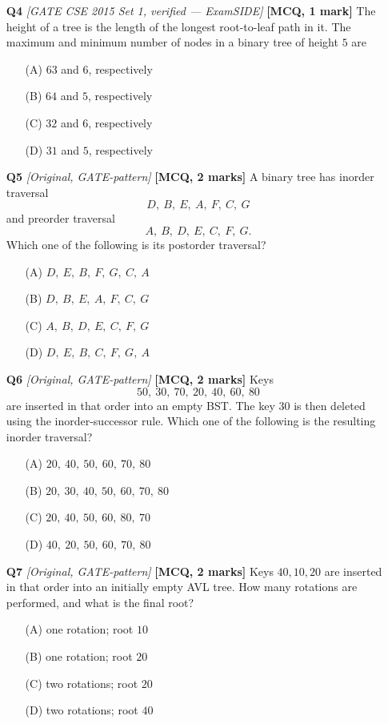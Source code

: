 \documentclass[11pt]{article}
\begin{document}
\begin{enumerate}
\item[\textbf{Q4}] \textit{[GATE CSE 2015 Set 1, verified --- ExamSIDE]} \textbf{[MCQ, 1 mark]} The height of a tree is the length of the longest root-to-leaf path in it. The maximum and minimum number of nodes in a binary tree of height $5$ are
\begin{enumerate}
  \item[(A)] $63$ and $6$, respectively
  \item[(B)] $64$ and $5$, respectively
  \item[(C)] $32$ and $6$, respectively
  \item[(D)] $31$ and $5$, respectively
\end{enumerate}

\item[\textbf{Q5}] \textit{[Original, GATE-pattern]} \textbf{[MCQ, 2 marks]} A binary tree has inorder traversal
\[
  D,\ B,\ E,\ A,\ F,\ C,\ G
\]
and preorder traversal
\[
  A,\ B,\ D,\ E,\ C,\ F,\ G.
\]
Which one of the following is its postorder traversal?
\begin{enumerate}
  \item[(A)] $D,\ E,\ B,\ F,\ G,\ C,\ A$
  \item[(B)] $D,\ B,\ E,\ A,\ F,\ C,\ G$
  \item[(C)] $A,\ B,\ D,\ E,\ C,\ F,\ G$
  \item[(D)] $D,\ E,\ B,\ C,\ F,\ G,\ A$
\end{enumerate}

\item[\textbf{Q6}] \textit{[Original, GATE-pattern]} \textbf{[MCQ, 2 marks]} Keys
\[
  50,\ 30,\ 70,\ 20,\ 40,\ 60,\ 80
\]
are inserted in that order into an empty BST. The key $30$ is then deleted using the inorder-successor rule. Which one of the following is the resulting inorder traversal?
\begin{enumerate}
  \item[(A)] $20,\ 40,\ 50,\ 60,\ 70,\ 80$
  \item[(B)] $20,\ 30,\ 40,\ 50,\ 60,\ 70,\ 80$
  \item[(C)] $20,\ 40,\ 50,\ 60,\ 80,\ 70$
  \item[(D)] $40,\ 20,\ 50,\ 60,\ 70,\ 80$
\end{enumerate}

\item[\textbf{Q7}] \textit{[Original, GATE-pattern]} \textbf{[MCQ, 2 marks]} Keys $40,10,20$ are inserted in that order into an initially empty AVL tree. How many rotations are performed, and what is the final root?
\begin{enumerate}
  \item[(A)] one rotation; root $10$
  \item[(B)] one rotation; root $20$
  \item[(C)] two rotations; root $20$
  \item[(D)] two rotations; root $40$
\end{enumerate}


\end{enumerate}
\end{document}
